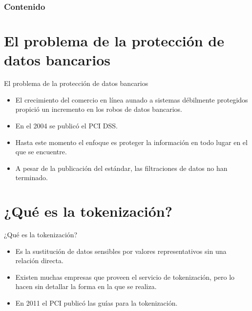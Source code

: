 \documentclass{beamer}
\begin{document}
  {
  \frame{\titlepage}}

  \begin{frame}
    \frametitle{Contenido}
    \setcounter{tocdepth}{1}
    \tableofcontents
  \end{frame}

  \setlength{\parskip}{0.5em}

  \section{El problema de la protección de datos bancarios}

  \begin{frame}{El problema de la protección de datos bancarios}
    \begin{itemize}
      \item El crecimiento del comercio en línea aunado a sistemas débilmente
        protegidos propició un incremento en los robos de datos bancarios.
      \item En el 2004 se publicó el PCI DSS\footnotemark.
      \item Hasta este momento el enfoque es proteger la información en todo
        lugar en el que se encuentre.
      \item A pesar de la publicación del estándar, las filtraciones de datos
        no han terminado.
    \end{itemize}
  \end{frame}

  \section{¿Qué es la tokenización?}

  \begin{frame}{¿Qué es la tokenización?}
    \begin{itemize}
      \item Es la sustitución de datos sensibles por valores representativos
        sin una relación directa.
      \item Existen muchas empresas que proveen el servicio de tokenización,
        pero lo hacen sin detallar la forma en la que se realiza.
      \item En 2011 el PCI publicó las guías para la tokenización.
    \end{itemize}
  \end{frame}
\end{document}
